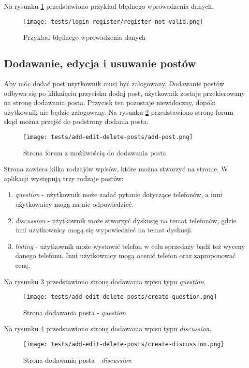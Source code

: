 Na rysunku \ref{login_error} przedstawiono przykład błędnego wprowadzenia danych.
\begin{figure}[H]
  \centering
  \texttt{[image: tests/login-register/register-not-valid.png]}
  \caption{Przykład błędnego wprowadzenia danych}
  \label{login_error}
\end{figure}

\subsection{Dodawanie, edycja i usuwanie postów}
Aby móc dodać post użytkownik musi być zalogowany. Dodawanie postów odbywa się po kliknięciu przycisku dodaj post, użytkownik zostaje przekierowany na stronę dodawania posta. Przycisk ten pozostaje niewidoczny, dopóki użytkownik nie będzie zalogowany. Na rysunku \ref{add_post} przedstawiono stronę forum skąd można przejść do podstrony dodania posta.
\begin{figure}[H]
  \centering
  \texttt{[image: tests/add-edit-delete-posts/add-post.png]}
  \caption{Strona forum z możliwością do dodawania posta}
  \label{add_post}
\end{figure}
Strona zawiera kilka rodzajów wpisów, które można stworzyć na stronie. W aplikacji występują trzy rodzaje postów: 
\begin{enumerate}
  \item \textit{question} - użytkownik może zadać pytanie dotyczące telefonów, a inni użytkownicy mogą na nie odpowiedzieć.
  \item \textit{discussion} - użytkownik może stworzyć dyskusję na temat telefonów, gdzie inni użytkownicy mogą się wypowiedzieć na temat dyskusji.
  \item \textit{listing} - użytkownik może wystawić telefon w celu sprzedaży bądź też wyceny danego telefonu. Inni użytkownicy mogą ocenić telefon oraz zaproponować cenę.
\end{enumerate}
Na rysunku \ref{add_question_page} przedstawiono stronę dodawania wpisu typu \textit{question}.
\begin{figure}[H]
  \centering
  \texttt{[image: tests/add-edit-delete-posts/create-question.png]}
  \caption{Strona dodawania posta - \textit{question}}
  \label{add_question_page}
\end{figure}
Na rysunku \ref{add_discussion_post} przedstawiono stronę dodawania wpisu typu \textit{discussion}.
\begin{figure}[H]
  \centering
  \texttt{[image: tests/add-edit-delete-posts/create-discussion.png]}
  \caption{Strona dodawania posta - \textit{discussion}}
  \label{add_discussion_post}
\end{figure}
